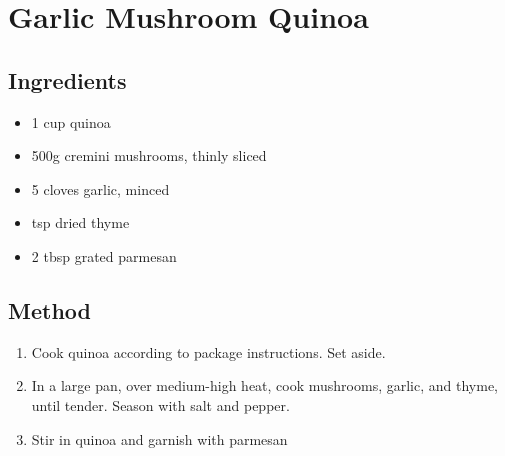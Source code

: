\section{Garlic Mushroom Quinoa}
\begin{multicols}{2}
  \subsection{Ingredients}
    \begin{itemize}
      \item 1 cup quinoa
      \item 500g cremini mushrooms, thinly sliced
      \item 5 cloves garlic, minced
      \item {} tsp dried thyme
      \item 2 tbsp grated parmesan
    \end{itemize}
  \vfill\null
  \columnbreak
  \subsection{Method}
    \begin{enumerate}
      \item Cook quinoa according to package instructions. Set aside.
      \item In a large pan, over medium-high heat, cook mushrooms, garlic, and thyme, until tender. Season with salt and pepper.
      \item Stir in quinoa and garnish with parmesan
    \end{enumerate}
  \end{multicols}
